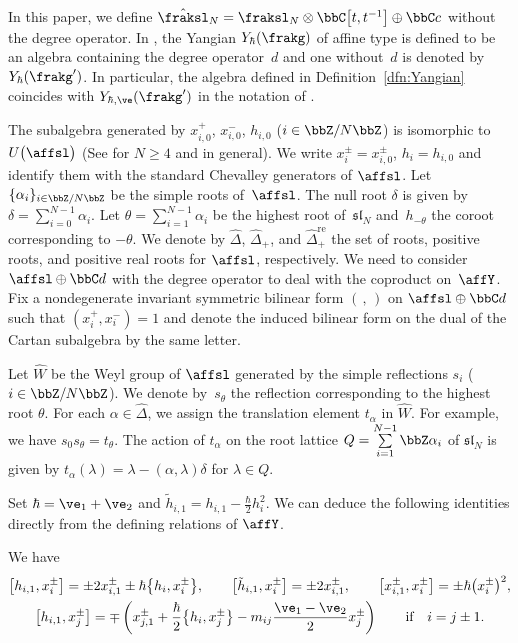 \begin{rem}In this paper, we define $\hat\fraksl_N = \fraksl_N \otimes \bbC\big[t,t^{-1}\big] \oplus \bbC c$ without the degree operator. In \cite{MR3861718}, the Yangian $Y_{\hbar}(\frakg)$ of affine type is defined to be an algebra containing the degree opera\-tor~$d$ and one without~$d$ is denoted by~$Y_{\hbar}(\frakg')$. In particular, the algebra defined in Definition~\ref{dfn:Yangian} coincides with $Y_{\hbar,\ve}(\frakg')$ in the notation of \cite[Definition~7.1]{MR3861718}.
\end{rem}

The subalgebra generated by $x_{i,0}^+$, $x_{i,0}^-$, $h_{i,0}$ ($i \in \bbZ / N\bbZ$) is isomorphic to $U\big(\affsl\big)$ (See \cite[Theorem~6.1]{MR2323534} for $N \geq 4$ and \cite[Theorem~6.9]{GRW} in general). We write $x_{i}^{\pm} = x_{i,0}^{\pm}$, $h_{i} = h_{i,0}$ and identify them with the standard Chevalley generators of $\affsl$. Let $\{\alpha_i\}_{i \in \bbZ/N\bbZ}$ be the simple roots of~$\affsl$. The null root $\delta$ is given by $\delta=\sum\limits_{i=0}^{N-1} \alpha_i$. Let $\theta = \sum\limits_{i=1}^{N-1} \alpha_i$ be the highest root of~$\mathfrak{sl}_N$ and~$h_{-\theta}$ the coroot corresponding to $-\theta$. We denote by $\hat{\Delta}$, $\hat{\Delta}_+$, and $\hat{\Delta}_+^{\mathrm{re}}$ the set of roots, positive roots, and positive real roots for $\affsl$, respectively. We need to consider $\affsl \oplus \bbC d$ with the degree operator to deal with the coproduct on~$\affY$. Fix a nondegenerate invariant symmetric bilinear form $(\, ,\, )$ on $\affsl \oplus \bbC d$ such that $(x_i^+,x_i^-)=1$ and denote the induced bilinear form on the dual of the Cartan subalgebra by the same letter.

Let $\hat{W}$ be the Weyl group of $\affsl$ generated by the simple reflections $s_i$ ($i \in \bbZ/N\bbZ$). We denote by~$s_{\theta}$ the reflection corresponding to the highest root $\theta$. For each $\alpha \in \hat{\Delta}$, we assign the translation element $t_{\alpha}$ in $\hat{W}$. For example, we have $s_0 s_{\theta} = t_{\theta}$. The action of $t_{\alpha}$ on the root lattice $Q=\sum\limits_{i=1}^{N-1} \bbZ \alpha_i$ of $\mathfrak{sl}_N$ is given by $t_{\alpha}(\lambda) = \lambda - (\alpha,\lambda)\delta$ for $\lambda \in Q$.

Set $\hbar = \ve_1 + \ve_2$ and $\tilde{h}_{i,1} = h_{i,1} - \frac{\hbar}{2} h_{i}^2$. We can deduce the following identities directly from the defining relations of $\affY$.
\begin{lem}\label{lem:relations}
We have
\begin{gather*}
\big[h_{i,1}, x_{i}^{\pm}\big] = \pm2 x_{i,1}^{\pm} \pm \hbar \big\{h_i,x_i^{\pm}\big\}, \qquad \big[\tilde{h}_{i,1}, x_{i}^{\pm}\big] = \pm2 x_{i,1}^{\pm}, \qquad \big[x_{i,1}^{\pm},x_i^{\pm}\big] = \pm \hbar \big(x_i^{\pm}\big)^2,\\
\big[h_{i,1}, x_{j}^{\pm}\big] = \mp \left( x_{j,1}^{\pm} + \dfrac{\hbar}{2} \big\{h_i,x_j^{\pm}\big\} - m_{ij} \dfrac{\ve_1-\ve_2}{2}x_j^{\pm} \right) \qquad \text{if} \quad i=j \pm 1.
\end{gather*}
\end{lem}

